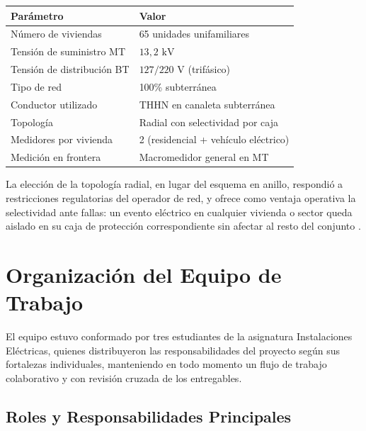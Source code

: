 \begin{tabular}{ll}
  \toprule
  \bfseries Par\'ametro & \bfseries Valor \\
  \midrule
  N\'umero de viviendas         & 65 unidades unifamiliares \\
  Tensi\'on de suministro MT    & $13{,}2\text{ kV}$ \\
  Tensi\'on de distribuci\'on BT & $127/220\text{ V}$ (trif\'asico) \\
  Tipo de red                  & 100\% subterr\'anea \\
  Conductor utilizado          & THHN en canaleta subterr\'anea \\
  Topolog\'ia                  & Radial con selectividad por caja \\
  Medidores por vivienda       & 2 (residencial + veh\'iculo el\'ectrico) \\
  Medici\'on en frontera       & Macromedidor general en MT \\
  \bottomrule
\end{tabular}

\vspace{6pt}

La elecci\'on de la topolog\'ia radial, en lugar del esquema
en anillo, respondi\'o a restricciones regulatorias del operador
de red, y ofrece como ventaja operativa la selectividad ante fallas:
un evento el\'ectrico en cualquier vivienda o sector queda aislado
en su caja de protecci\'on correspondiente sin afectar al resto
del conjunto \citep{icontec2050}.

\section{Organizaci\'on del Equipo de Trabajo}

El equipo estuvo conformado por tres estudiantes de la asignatura
Instalaciones El\'ectricas, quienes distribuyeron las
responsabilidades del proyecto seg\'un sus fortalezas individuales,
manteniendo en todo momento un flujo de trabajo colaborativo y
con revisi\'on cruzada de los entregables.

\subsection{Roles y Responsabilidades Principales}

